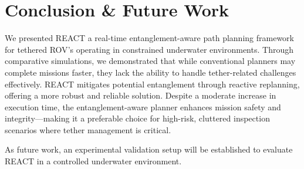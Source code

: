 
\section{Conclusion & Future Work}
\label{sec:conclusion}
We presented \ac{REACT} a real-time entanglement-aware path planning framework for tethered \ac{ROV}'s operating in constrained underwater environments. Through comparative simulations, we demonstrated that while conventional planners may complete missions faster, they lack the ability to handle tether-related challenges effectively. \ac{REACT} mitigates potential entanglement through reactive replanning, offering a more robust and reliable solution. Despite a moderate increase in execution time, the entanglement-aware planner enhances mission safety and integrity—making it a preferable choice for high-risk, cluttered inspection scenarios where tether management is critical. 

As future work, an experimental validation setup will be established to evaluate \ac{REACT} in a controlled underwater environment. 





